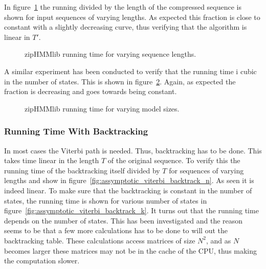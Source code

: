 In figure~\ref{fig:assymptotic_viterbi_n} the running divided by the length of
the compressed sequence is shown for input sequences of varying lengths. As
expected this fraction is close to constant with a slightly decreasing curve,
thus verifying that the algorithm is linear in $T'$.

\begin{figure}
  \centering
  
  \caption{zipHMMlib running time for varying sequence lengths.}
  \label{fig:assymptotic_viterbi_n}
\end{figure}

A similar experiment has been conducted to verify that the running time i cubic
in the number of states. This is shown in
figure~\ref{fig:assymptotic_viterbi_k}. Again, as expected the fraction is
decreasing and goes towards being constant.

\begin{figure}
  \centering
  
  \caption{zipHMMlib running time for varying model sizes.}
  \label{fig:assymptotic_viterbi_k}
\end{figure}

\subsubsection{Running Time With Backtracking}

In most cases the Viterbi path is needed. Thus, backtracking has to be
done. This takes time linear in the length $T$ of the original sequence. To
verify this the running time of the backtracking itself divided by $T$ for
sequences of varying lengths and show in
figure~\ref{fig:assymptotic_viterbi_backtrack_n}. As seen it is indeed
linear. To make sure that the backtracking is constant in the number of states,
the running time is shown for various number of states in
figure~\ref{fig:assymptotic_viterbi_backtrack_k}. It turns out that the running
time depends on the number of states. This has been investigated and the reason
seems to be that a few more calculations has to be done to will out the
backtracking table. These calculations access matrices of size $N^2$, and as
$N$ becomes larger these matrices may not be in the cache of the CPU, thus
making the computation slower. 

